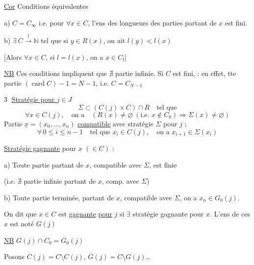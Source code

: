 \uline{Cor} Conditions équivalentes

 a) $C=C_\infty$ i.e. pour $\forall x\in C$, l'ens des longueurs des parties partant de $x$ est fini.

 b) $\exists\ C\xrightarrow{l}\mathbb N$ tel que si $y\in R(x)$, on ait $l(y)<l(x)$

[Alors $\forall x\in C$, si $l=l(x)$, on a $x\in C_l$]


\uline{NB} Ces conditions impliquent que $\nexists$ partie infinie.
 Si $C$ est fini,  : en effet, tte partie   $(\operatorname{card}C)-1=N-1$, i.e. $C=C_{N-1}$


\textcircled{3} \uline{Stratégie pour $j\in J$}
\[
\Sigma\subset(C(j)\times C)\cap R\quad\text{tel que}
\]
\[
\forall x\in C(j),\quad\text{on a}\quad(R(x)\ne\varnothing\ (\text{i.e. }x\notin C_0)\Longrightarrow\Sigma(x)\ne\varnothing)
\]
Partie $\underline x=(x_0,\ldots,x_n)$ \uline{compatible} avec stratégie $\Sigma$ pour $j$ :
\[
\forall\,0\leq i\leq n-1\quad\text{tel que }x_i\in C(j),\quad\text{on a }x_{i+1}\in\Sigma(x_i)
\]

\uline{Stratégie gagnante}  pour $x$ $(\in C)$ :

 a) Toute partie partant de $x$, compatible avec $\Sigma$, est finie

(i.e. $\nexists$ partie infinie partant de $x$, comp. avec $\Sigma$)

 b)  Toute partie terminée, partant de $x$,  compatible avec $\Sigma$, on a $x_n\in G_0(j)$.

On dit que $x\in C$ est \uline{gagnante} \uline{pour} $j$ si $\exists$ stratégie  gagnante pour $x$.
L'ens de ces $x$ est noté $G(j)$

\uline{NB} $G(j)\cap C_0=G_0(j)$

Posons $\overline C(j)=C\setminus C(j)$, $\overline G(j)=C\setminus G(j)$\ldots

